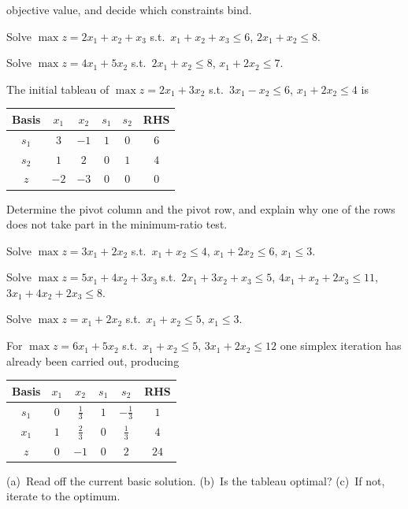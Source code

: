 \begin{problems}
        objective value, and decide which constraints bind.
  \item Solve $\max z=2x_1+x_2+x_3$ s.t.\ $x_1+x_2+x_3\le 6$,
        $2x_1+x_2\le 8$.
  \item Solve $\max z=4x_1+5x_2$ s.t.\ $2x_1+x_2\le 8$, $x_1+2x_2\le 7$.
  \item The initial tableau of $\max z=2x_1+3x_2$ s.t.\ $3x_1-x_2\le 6$,
        $x_1+2x_2\le 4$ is
        \begin{center}
        \begin{tabular}{c|cccc|c}
        Basis & $x_1$ & $x_2$ & $s_1$ & $s_2$ & RHS\\
        \hline
        $s_1$ & $3$ & $-1$ & $1$ & $0$ & $6$\\
        $s_2$ & $1$ & $2$ & $0$ & $1$ & $4$\\
        \hline
        $z$ & $-2$ & $-3$ & $0$ & $0$ & $0$\\
        \end{tabular}
        \end{center}
        Determine the pivot column and the pivot row, and explain why one
        of the rows does not take part in the minimum-ratio test.
  \item Solve $\max z=3x_1+2x_2$ s.t.\ $x_1+x_2\le 4$, $x_1+2x_2\le 6$,
        $x_1\le 3$.
  \item Solve $\max z=5x_1+4x_2+3x_3$ s.t.\ $2x_1+3x_2+x_3\le 5$,
        $4x_1+x_2+2x_3\le 11$, $3x_1+4x_2+2x_3\le 8$.
  \item Solve $\max z=x_1+2x_2$ s.t.\ $x_1+x_2\le 5$, $x_1\le 3$.
  \item For $\max z=6x_1+5x_2$ s.t.\ $x_1+x_2\le 5$, $3x_1+2x_2\le 12$
        one simplex iteration has already been carried out, producing
        \begin{center}
        \begin{tabular}{c|cccc|c}
        Basis & $x_1$ & $x_2$ & $s_1$ & $s_2$ & RHS\\
        \hline
        $s_1$ & $0$ & $\tfrac{1}{3}$ & $1$ & $-\tfrac{1}{3}$ & $1$\\
        $x_1$ & $1$ & $\tfrac{2}{3}$ & $0$ & $\tfrac{1}{3}$ & $4$\\
        \hline
        $z$ & $0$ & $-1$ & $0$ & $2$ & $24$\\
        \end{tabular}
        \end{center}
        (a)~Read off the current basic solution. (b)~Is the tableau
        optimal? (c)~If not, iterate to the optimum.
\end{problems}

